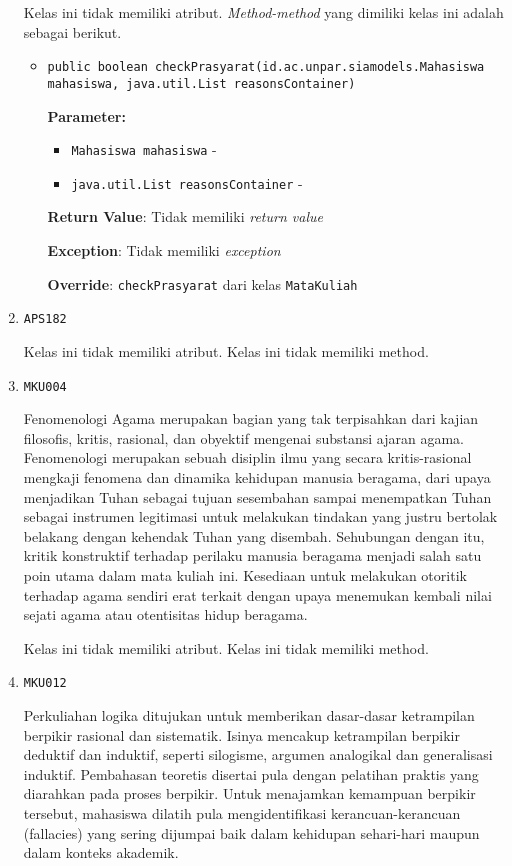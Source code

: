\documentclass{article}
\begin{document}
\begin{enumerate}
Kelas ini tidak memiliki atribut. \textit{Method-method} yang dimiliki kelas ini adalah sebagai berikut.
\begin{itemize}
\item \texttt{public boolean checkPrasyarat(id.ac.unpar.siamodels.Mahasiswa mahasiswa, java.util.List reasonsContainer)}

\textbf{Parameter:}
\begin{itemize}
\item \texttt{Mahasiswa mahasiswa} - 
\item \texttt{java.util.List reasonsContainer} - 
\end{itemize}
\textbf{Return Value}: Tidak memiliki \textit{return value}

\textbf{Exception}: Tidak memiliki \textit{exception}

\textbf{Override}: \texttt{checkPrasyarat} dari kelas \texttt{MataKuliah}

\end{itemize}
\item \texttt{APS182}



Kelas ini tidak memiliki atribut. Kelas ini tidak memiliki method. \item \texttt{MKU004}

Fenomenologi Agama merupakan bagian yang tak terpisahkan dari kajian filosofis, kritis, 
 rasional, dan obyektif mengenai substansi ajaran agama. Fenomenologi merupakan sebuah 
 disiplin ilmu yang secara kritis-rasional mengkaji fenomena dan dinamika kehidupan manusia 
 beragama, dari upaya menjadikan Tuhan sebagai tujuan sesembahan sampai menempatkan Tuhan 
 sebagai instrumen legitimasi untuk melakukan tindakan yang justru bertolak belakang dengan 
 kehendak Tuhan yang disembah. Sehubungan dengan itu, kritik konstruktif terhadap perilaku 
 manusia beragama menjadi salah satu poin utama dalam mata kuliah ini. Kesediaan untuk 
 melakukan otoritik terhadap agama sendiri erat terkait dengan upaya menemukan kembali nilai
 sejati agama atau otentisitas hidup beragama.

Kelas ini tidak memiliki atribut. Kelas ini tidak memiliki method. \item \texttt{MKU012}

Perkuliahan logika ditujukan untuk memberikan dasar-dasar ketrampilan berpikir rasional dan
 sistematik. Isinya mencakup ketrampilan berpikir deduktif dan induktif, seperti silogisme, 
 argumen analogikal dan generalisasi induktif. Pembahasan teoretis disertai pula dengan
 pelatihan praktis yang diarahkan pada proses berpikir. Untuk menajamkan kemampuan berpikir 
 tersebut, mahasiswa dilatih pula mengidentifikasi kerancuan-kerancuan (fallacies) yang sering 
 dijumpai baik dalam kehidupan sehari-hari maupun dalam konteks akademik.


\end{enumerate}
\end{document}
